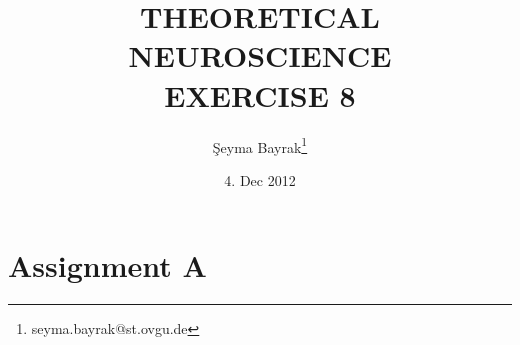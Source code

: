 \documentclass{article}
\begin{document}
\title{THEORETICAL NEUROSCIENCE \\ EXERCISE 8}
\date{4. Dec 2012}
\author[1]{\c{S}eyma Bayrak\thanks{seyma.bayrak@st.ovgu.de}}
\maketitle

\section*{Assignment A}
\end{document}
